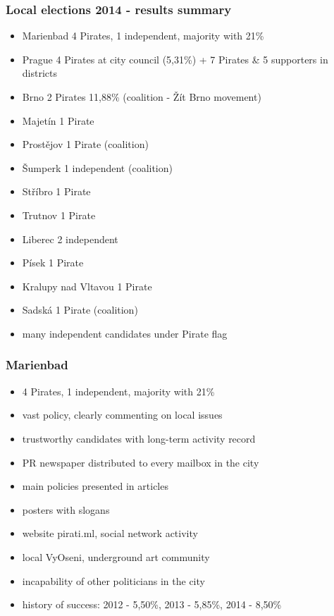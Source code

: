 \begin{frame}
	\frametitle{Local elections 2014 - results summary}
	\begin{itemize}
	\item Marienbad 4 Pirates, 1 independent, majority with 21\%
	\item Prague 4 Pirates at city council (5,31\%) + 7 Pirates \& 5 supporters in districts
	\item Brno 2 Pirates 11,88\% (coalition - \v{Z}\'it Brno movement)
	\item Majet\'in 1 Pirate
	\item Prost\v{e}jov 1 Pirate (coalition)
	\item \v{S}umperk 1 independent (coalition)
	\item St\v{r}\'ibro 1 Pirate
	\item Trutnov 1 Pirate
	\item Liberec 2 independent
	\item P\'isek 1 Pirate
	\item Kralupy nad Vltavou 1 Pirate
	\item Sadsk\'a 1 Pirate (coalition)
	\item many independent candidates under Pirate flag
	\end{itemize}
\end{frame}
\begin{frame}
	\frametitle{Marienbad}
	\begin{itemize}
	\item 4 Pirates, 1 independent, majority with 21\%
	\item vast policy, clearly commenting on local issues
	\item trustworthy candidates with long-term activity record
	\item PR newspaper distributed to every mailbox in the city
	\item main policies presented in articles
	\item posters with slogans
	\item website pirati.ml, social network activity
	\item local VyOseni, underground art community
	\item incapability of other politicians in the city
	\item history of success: 2012 - 5,50\%, 2013 - 5,85\%, 2014 - 8,50\%
	\end{itemize}
\end{frame}
